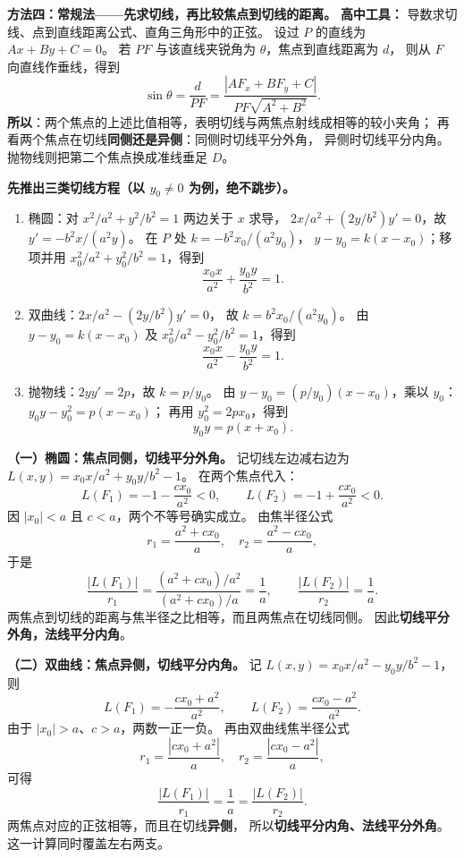 \clearpage
\begin{proofbox}
\textbf{方法四：常规法——先求切线，再比较焦点到切线的距离。}
\textbf{高中工具：} 导数求切线、点到直线距离公式、直角三角形中的正弦。
设过 $P$ 的直线为 $Ax+By+C=0$。
若 $PF$ 与该直线夹锐角为 $\theta$，焦点到直线距离为 $d$，
则从 $F$ 向直线作垂线，得到
\[
\sin\theta=\frac{d}{PF}
=\frac{|AF_x+BF_y+C|}{PF\sqrt{A^2+B^2}}.
\]
\textbf{所以}：两个焦点的上述比值相等，表明切线与两焦点射线成相等的较小夹角；
再看两个焦点在切线\textbf{同侧还是异侧}：同侧时切线平分外角，
异侧时切线平分内角。抛物线则把第二个焦点换成准线垂足 $D$。

\begin{center}\end{center}
\pagebreak
\textbf{先推出三类切线方程（以 $y_0\ne0$ 为例，绝不跳步）。}
\begin{enumerate}
\item 椭圆：对 $x^2/a^2+y^2/b^2=1$ 两边关于 $x$ 求导，
$2x/a^2+(2y/b^2)y'=0$，故
$y'=-b^2x/(a^2y)$。
在 $P$ 处 $k=-b^2x_0/(a^2y_0)$，
$y-y_0=k(x-x_0)$；移项并用
$x_0^2/a^2+y_0^2/b^2=1$，得到
\[
\boxed{\frac{x_0x}{a^2}+\frac{y_0y}{b^2}=1}.
\]
\item 双曲线：$2x/a^2-(2y/b^2)y'=0$，
故 $k=b^2x_0/(a^2y_0)$。
由 $y-y_0=k(x-x_0)$ 及
$x_0^2/a^2-y_0^2/b^2=1$，得到
\[
\boxed{\frac{x_0x}{a^2}-\frac{y_0y}{b^2}=1}.
\]
\item 抛物线：$2yy'=2p$，故 $k=p/y_0$。
由 $y-y_0=(p/y_0)(x-x_0)$，乘以 $y_0$：
$y_0y-y_0^2=p(x-x_0)$；
再用 $y_0^2=2px_0$，得到
\[
\boxed{y_0y=p(x+x_0)}.
\]
\end{enumerate}

\textbf{（一）椭圆：焦点同侧，切线平分外角。}
记切线左边减右边为
$L(x,y)=x_0x/a^2+y_0y/b^2-1$。
在两个焦点代入：
\[
L(F_1)=-1-\frac{cx_0}{a^2}<0,\qquad
L(F_2)=-1+\frac{cx_0}{a^2}<0.
\]
因 $|x_0|<a$ 且 $c<a$，两个不等号确实成立。
由焦半径公式
\[
r_1=\frac{a^2+cx_0}{a},\quad
r_2=\frac{a^2-cx_0}{a},
\]
于是
\[
\frac{|L(F_1)|}{r_1}
=\frac{(a^2+cx_0)/a^2}{(a^2+cx_0)/a}
=\frac1a,
\qquad
\frac{|L(F_2)|}{r_2}=\frac1a.
\]
两焦点到切线的距离与焦半径之比相等，而且两焦点在切线同侧。
因此\textbf{切线平分外角，法线平分内角}。

\textbf{（二）双曲线：焦点异侧，切线平分内角。}
记 $L(x,y)=x_0x/a^2-y_0y/b^2-1$，则
\[
L(F_1)=-\frac{cx_0+a^2}{a^2},\qquad
L(F_2)=\frac{cx_0-a^2}{a^2}.
\]
由于 $|x_0|>a$、$c>a$，两数一正一负。
再由双曲线焦半径公式
\[
r_1=\frac{|cx_0+a^2|}{a},\quad
r_2=\frac{|cx_0-a^2|}{a},
\]
可得
\[
\frac{|L(F_1)|}{r_1}=\frac1a
=\frac{|L(F_2)|}{r_2}.
\]
两焦点对应的正弦相等，而且在切线\textbf{异侧}，
所以\textbf{切线平分内角、法线平分外角}。这一计算同时覆盖左右两支。


\end{proofbox}
